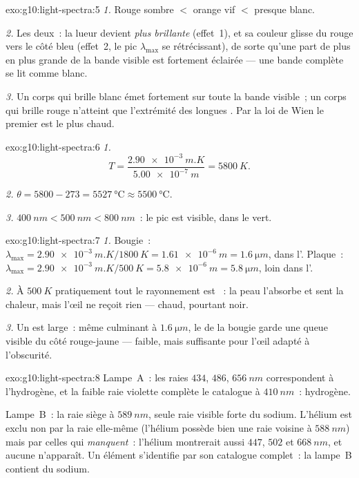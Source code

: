 \begin{solution}{exo:g10:light-spectra:5}
\emph{1.} Rouge sombre $<$ orange vif $<$ presque blanc.

\emph{2.} Les deux~: la lueur devient \emph{plus brillante} (effet~1), et
sa couleur glisse du rouge vers le côté bleu (effet~2, le pic
$\lambda_{\max}$ se rétrécissant), de sorte qu'une part de plus en plus
grande de la bande visible est fortement éclairée --- une bande complète
se lit comme blanc.

\emph{3.} Un corps qui brille blanc émet fortement sur toute la bande
visible~; un corps qui brille rouge n'atteint que l'extrémité des
longues . Par la loi de Wien le premier est le
plus chaud.
\end{solution}

\begin{solution}{exo:g10:light-spectra:6}
\emph{1.}
\[
T = \frac{\qty{2.90e-3}{m.K}}{\qty{5.00e-7}{m}} = \qty{5800}{K}.
\]

\emph{2.} $\theta = 5800 - 273 = \qty{5527}{\degreeCelsius} \approx
\qty{5500}{\degreeCelsius}$.

\emph{3.} $\qty{400}{nm} < \qty{500}{nm} < \qty{800}{nm}$~: le pic est
visible, dans le vert.
\end{solution}

\begin{solution}{exo:g10:light-spectra:7}
\emph{1.} Bougie~:
$\lambda_{\max} = \qty{2.90e-3}{m.K} / \qty{1800}{K} = \qty{1.61e-6}{m}
= \qty{1.6}{\micro m}$, dans l'. Plaque~:
$\lambda_{\max} = \qty{2.90e-3}{m.K} / \qty{500}{K} = \qty{5.8e-6}{m}
= \qty{5.8}{\micro m}$, loin dans l'.

\emph{2.} À $\qty{500}{K}$ pratiquement tout le rayonnement est
~: la peau l'absorbe et sent la chaleur, mais l'œil ne
reçoit rien --- chaud, pourtant noir.

\emph{3.} Un  est large~: même culminant à
$\qty{1.6}{\micro m}$, le  de la bougie garde une queue visible
du côté rouge-jaune --- faible, mais suffisante pour l'œil adapté à
l'obscurité.
\end{solution}

\begin{solution}{exo:g10:light-spectra:8}
Lampe~A~: les raies $434$, $486$, $\qty{656}{nm}$ correspondent à
l'hydrogène, et la faible raie violette complète le catalogue à
$\qty{410}{nm}$~: hydrogène.

Lampe~B~: la raie siège à $\qty{589}{nm}$, seule raie visible forte du
sodium. L'hélium est exclu non par la raie elle-même (l'hélium possède
bien une raie voisine à $\qty{588}{nm}$) mais par celles qui
\emph{manquent}~: l'hélium montrerait aussi $447$, $502$ et
$\qty{668}{nm}$, et aucune n'apparaît. Un élément s'identifie par son
catalogue complet~: la lampe~B contient du sodium.
\end{solution}

